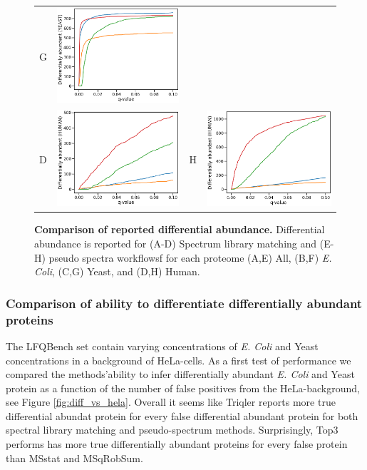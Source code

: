 \documentclass[10pt,letterpaper]{article}
\begin{document}
\begin{figure}[hbt]
\begin{tabular}{lclc}
        G & \includegraphics[width=0.4\linewidth]{../../result/report_plots/diann_de_yeast.png} \\ 
        D & \includegraphics[width=0.4\linewidth]{../../result/report_plots/osw_de_human.png} &
        H & \includegraphics[width=0.4\linewidth]{../../result/report_plots/diann_de_human.png} 
    \end{tabular}
    \caption{{\bf Comparison of reported differential abundance.} Differential abundance is reported for (A-D) Spectrum library matching and (E-H) pseudo spectra workflowsf for each proteome 
    (A,E) All, (B,F) {\em E. Coli}, (C,G) Yeast, and (D,H) Human. \label{fig:da_lineplot}}
\end{figure}


\subsubsection*{Comparison of ability to differentiate differentially abundant proteins}

The LFQBench set contain varying concentrations of {\em E. Coli} and Yeast concentrations in a background of HeLa-cells. As a first test of performance we compared the methods'ability to infer differentially abundant {\em E. Coli} and Yeast protein as a function of the number of false positives from the HeLa-background, see Figure \ref{fig:diff_vs_hela}. Overall it seems like Triqler reports more true differential abundat protein for every false differential abundant protein for both spectral library matching and pseudo-spectrum methods. Surprisingly, Top3 performs has more true differentially abundant proteins for every false protein than MSstat and MSqRobSum. 
\end{document}
